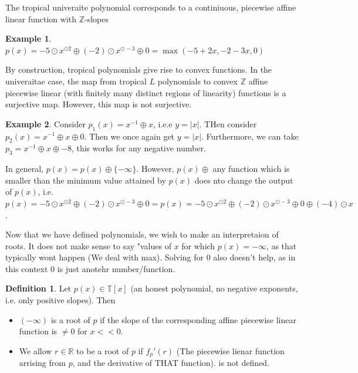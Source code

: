 \documentclass[12pt]{memoir}
\theoremstyle{definition}
\newtheorem{protoexample}{Example}[section]
\newenvironment{ex}
   {\begin{protoexample}}
   {\end{protoexample}}
\newtheorem{protodefinition}{Definition}[section]
\newenvironment{define}
   {\begin{protodefinition}}
   {\end{protodefinition}}
\def\ZZ{{\mathbb Z}}
\def\RR{{\mathbb R}}
\def\TT{{\mathbb T}}
\begin{document}
The tropical univeraite polynomial corresponds to a continiuous, piecewise affine linear function with $\ZZ$-slopes


\begin{ex}
    $p(x) =  -5\odot x^{\odot 2} \oplus (-2)\odot x^{\odot -3} \oplus 0= \max (-5+2x, -2-3x, 0)$
\end{ex}


By construction, tropical polynomials give rise to convex functions. In the univeraitae case, the map from tropical $L$ polynomials to convex $\ZZ$ affine piecewise linear (with finitely many distinct regions of linearity) functions is a surjective map. However, this map is not surjective.

\begin{ex}
    Consider $p_1(x) = x^{-1} \oplus x$, i.e.e $y = |x|$. THen consider $p_2(x) = x^{-1} \oplus x \oplus 0$. Then we once again get $y=|x|$. Furthermore, we can take $p_{3}=x^{-1} \oplus x \oplus -8$, this works for any negative number.


    In general, $p(x) = p(x) \oplus \{-\infty\}$. However, $p(x) \oplus$ any function which is smaller than the minimum value attained by $p(x)$ does nto change the output of $p(x)$, i.e.  $p(x) =  -5\odot x^{\odot 2} \oplus (-2)\odot x^{\odot -3} \oplus 0= p(x) =  -5\odot x^{\odot 2} \oplus (-2)\odot x^{\odot -3} \oplus 0 \oplus (-4)\odot x$.
\end{ex}

Now that we have defined polynomials, we wish to make an interpretaion of roots. It does not make sense to say "values of $x$ for which $p(x)= - \infty$, as that typically wont happen (We deal with max). Solving for $0$ also doesn't help, as in this context $0$ is just anotehr number/function.



\begin{define}
    Let $p(x) \in \TT[x]$ (an honest polynomial, no negative exponents, i.e. only positive slopes). Then
    \begin{itemize}
        \item $(-\infty)$ is a root of $p$ if the slope of the corresponding affine piecewise linear function is $\neq 0$ for $x <<0$.
        \item We allow $r \in \RR$ to be a root of $p$ if $f_p'(r)$ (The piecewise lienar function arrising from $p$, and the derivative of THAT function). is not defined.
    \end{itemize}
\end{define}
\end{document}
